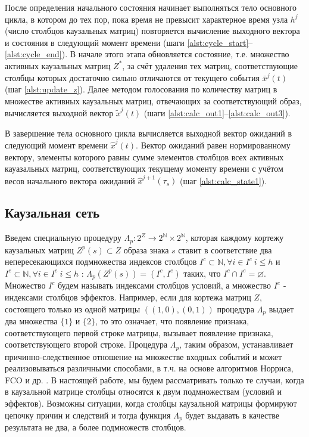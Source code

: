 \documentclass[12pt]{scrartcl}
\begin{document}
	После определения начального состояния начинает выполняться тело основного цикла, в котором до тех пор, пока время не превысит характерное время узла $h^j$ (число столбцов каузальных матриц) повторяется вычисление выходного вектора и состояния в следующий момент времени (шаги \ref{alst:cycle_start}--\ref{alst:cycle_end}). В начале этого этапа обновляется состояние, т.е. множество активных каузальных матриц $Z^*$, за счёт удаления тех матриц, соответствующие столбцы которых достаточно сильно отличаются от текущего события $\bar x^j(t)$ (шаг \ref{alst:update_z}). Далее методом голосования по количеству матриц в множестве активных каузальных матриц, отвечающих за соответствующий образ, вычисляется выходной вектор $\tilde x^j(t)$ (шаги \ref{alst:calc_out1}--\ref{alst:calc_out3}).

	В завершение тела основного цикла вычисляется выходной вектор ожиданий в следующий момент времени $\hat x^j(t)$. Вектор ожиданий равен нормированному вектору, элементы которого равны сумме элементов столбцов всех активных кауазальных матриц, соответствующих текущему моменту времени с учётом весов начального вектора ожиданий $\hat x^{j+1}(\tau_s)$ (шаг \ref{alst:calc_state1}).

	\subsection{Каузальная сеть}
	
	Введем специальную процедуру $\Lambda_p: 2^Z\rightarrow 2^{\mathbb N}\times 2^{\mathbb N}$, которая каждому кортежу каузальных матриц $Z^p(s)\subset Z$ образа знака $s$ ставит в соответствие два непересекающихся подмножества индексов столбцов $I^c\subset\mathbb N, \forall i\in I^c\ i\leq h$ и $I^e\subset\mathbb N, \forall i\in I^e\ i\leq h$ : $\Lambda_p(Z^p(s))=(I^c,I^e)$ таких, что $I^c\cap I^e=\varnothing$. Множество $I^c$ будем называть индексами столбцов условий, а множество $I^e$ - индексами столбцов эффектов. Например, если для кортежа матриц $Z$, состоящего только из одной матрицы $((1, 0), (0, 1))$ процедура $\Lambda_p$ выдает два множества $\{1\}$ и $\{2\}$, то это означает, что появление признака, соответствующего первой строке матрицы, вызывает появление признака, соответствующего второй строке. Процедура $\Lambda_p$, таким образом, устанавливает причинно-следственное отношение на множестве входных событий и может реализовываться различными способами, в т.ч. на основе алгоритмов Норриса, FCO и др. \cite{Kuznetsov2001,Kuznetsov1996}. В настоящей работе, мы будем рассматривать только те случаи, когда в каузальной матрице столбцы относятся к двум подмножествам (условий и эффектов). Возможны ситуации, когда столбцы каузальной матрицы формируют цепочку причин и следствий и тогда функция $\Lambda_p$ будет выдавать в качестве результата не два, а более подмножеств столбцов.
\end{document}
